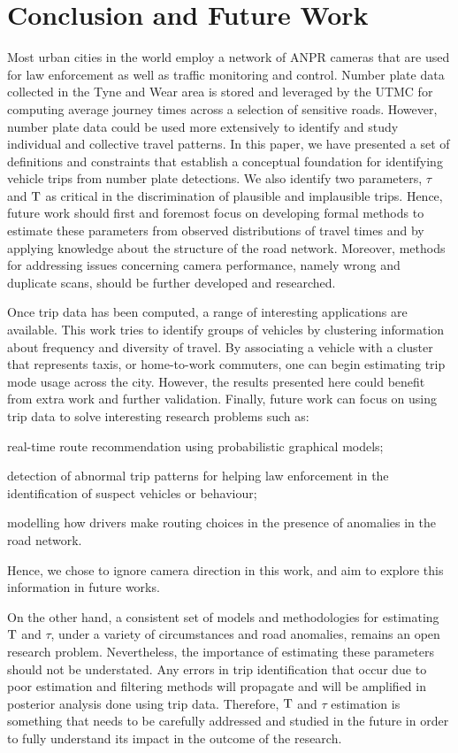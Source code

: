 \section{Conclusion and Future Work}\label{s.conclusions}

Most urban cities in the world employ a network of ANPR cameras that are used for law enforcement as well as traffic monitoring and control. Number plate data collected in the Tyne and Wear area is stored and leveraged by the UTMC for computing average journey times across a selection of sensitive roads. However, number plate data could be used more extensively to identify and study individual and collective travel patterns. In this paper, we have presented a set of definitions and constraints that establish a conceptual foundation for identifying vehicle trips from number plate detections. We also identify two parameters, $\tau$ and $\mathrm{T}$ as critical in the discrimination of plausible and implausible trips. Hence, future work should first and foremost focus on developing formal methods to estimate these parameters from observed distributions of travel times and by applying knowledge about the structure of the road network. Moreover, methods for addressing issues concerning camera performance, namely wrong and duplicate scans, should be further developed and researched.

Once trip data has been computed, a range of interesting applications are available. This work tries to identify groups of vehicles by clustering information about frequency and diversity of travel. By associating a vehicle with a cluster that represents taxis, or home-to-work commuters, one can begin estimating trip mode usage across the city. However, the results presented here could benefit from extra work and further validation. Finally, future work can focus on using trip data to solve interesting research problems such as:
\begin{enumerate*}[label=(\roman*)]
  \item real-time route recommendation using probabilistic graphical models;
  \item detection of abnormal trip patterns for helping law enforcement in the identification of suspect vehicles or behaviour;
  \item modelling how drivers make routing choices in the presence of anomalies in the road network.
\end{enumerate*}


Hence, we chose to ignore camera direction in this work, and aim to explore this information in future works.

On the other hand, a consistent set of models and methodologies for estimating $\mathrm{T}$ and $\tau$, under a variety of circumstances and road anomalies, remains an open research problem. Nevertheless, the importance of estimating these parameters should not be understated. Any errors in trip identification that occur due to poor estimation and filtering methods will propagate and will be amplified in posterior analysis done using trip data. Therefore, $\mathrm{T}$ and $\tau$ estimation is something that needs to be carefully addressed and studied in the future in order to fully understand its impact in the outcome of the research.

